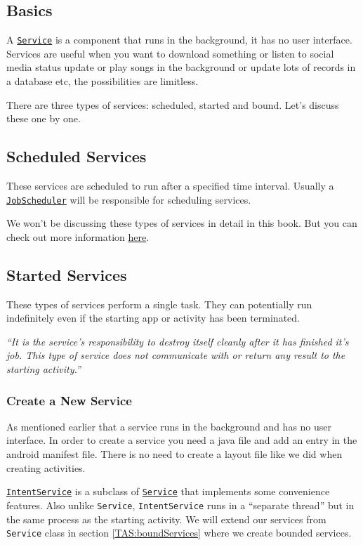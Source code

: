 \subsection{Basics}
\label{TAS:basics}
A \href{https://developer.android.com/guide/components/services.html}{\texttt{Service}} is a component that runs in the background, it has no user interface. Services are useful when you want to download something or listen to social media status update or play songs in the background or update lots of records in a database etc, the possibilities are limitless. 

There are three types of services: scheduled, started and bound. Let's discuss these one by one.

\subsection{Scheduled Services}
\label{TAS:scheduledServices}
These services are scheduled to run after a specified time interval. Usually a \href{https://developer.android.com/reference/android/app/job/JobScheduler.html}{\texttt{JobScheduler}} will be responsible for scheduling services.

We won't be discussing these types of services in detail in this book. But you can check out more information \href{URL}{here}.

\subsection{Started Services}
\label{TAS:startedServices}
These types of services perform a single task. They can potentially run indefinitely even if the starting app or activity has been terminated. 

\textit{``It is the service's responsibility to destroy itself cleanly after it has finished it's job. This type of service does not communicate with or return any result to the starting activity.''}

\subsubsection{Create a New Service}
\label{TAS:createNewService}
As mentioned earlier that a service runs in the background and has no user interface. In order to create a service you need a java file and add an entry in the android manifest file. There is no need to create a layout file like we did when creating activities.

\href{URL}{\texttt{IntentService}} is a subclass of \href{URL}{\texttt{Service}} that implements some convenience features. Also unlike \texttt{Service}, \texttt{IntentService} runs in a ``separate thread'' but in the same process as the starting activity. We will extend our services from \texttt{Service} class in section \ref{TAS:boundServices} where we create bounded services.

